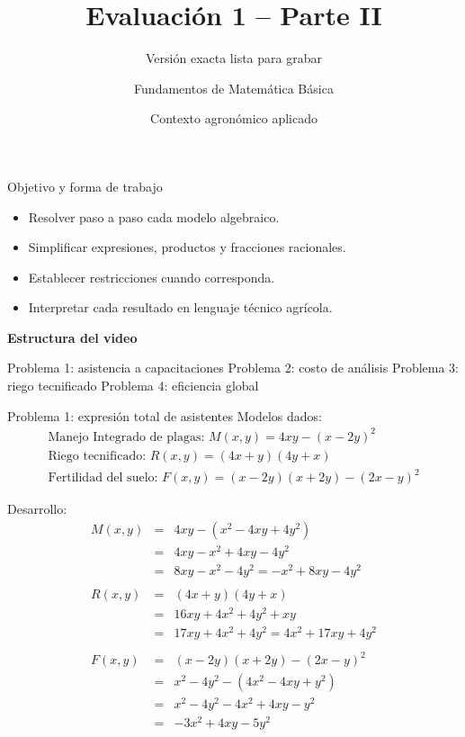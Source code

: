 \documentclass{beamer}
\title{Evaluación 1 -- Parte II}
\subtitle{Versión exacta lista para grabar}
\author{Fundamentos de Matemática Básica}
\date{Contexto agronómico aplicado}
\begin{document}
	
	\begin{frame}
		\titlepage
	\end{frame}
	
	\begin{frame}{Objetivo y forma de trabajo}
		\begin{itemize}
			\item Resolver paso a paso cada modelo algebraico.
			\item Simplificar expresiones, productos y fracciones racionales.
			\item Establecer restricciones cuando corresponda.
			\item Interpretar cada resultado en lenguaje técnico agrícola.
		\end{itemize}
		
		\textbf{Estructura del video}
		
		Problema 1: asistencia a capacitaciones \quad
		Problema 2: costo de análisis \quad
		Problema 3: riego tecnificado \quad
		Problema 4: eficiencia global
	\end{frame}
	
	\begin{frame}{Problema 1: expresión total de asistentes}
		Modelos dados:
		\[
		\begin{array}{l}
		\text{Manejo Integrado de plagas: }	M(x,y)=4xy-(x-2y)^2 \\
		\text{Riego tecnificado: }	R(x,y)=(4x+y)(4y+x) \\
		\text{Fertilidad del suelo: }	F(x,y)=(x-2y)(x+2y)-(2x-y)^2
		\end{array}
		\]
		
		Desarrollo:
		\[
		\begin{array}{lcl}
			M(x,y)&=&4xy-(x^2-4xy+4y^2) \\
		          &=&4xy-x^2+4xy-4y^2 \\
		          &=&8xy-x^2-4y^2=-x^2+8xy-4y^2 \\
				  &	&	    \\    
			R(x,y)&=&(4x+y)(4y+x) \\
			      &=&16xy+4x^2+4y^2+xy \\
			      &=&17xy+4x^2+4y^2 = 4x^2+17xy+4y^2 \\
			      & &	\\	
			F(x,y)&=&(x-2y)(x+2y)-(2x-y)^2 \\
				  &=&x^2-4y^2-(4x^2-4xy+y^2) \\
				  &=&x^2-4y^2-4x^2+4xy-y^2 \\
				  &=&-3x^2+4xy-5y^2
			\end{array} 
		\]
		
	\end{frame}
	
\end{document}
